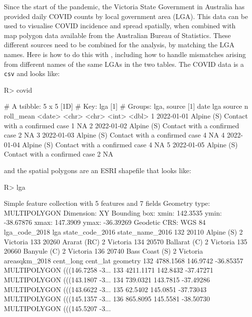 \documentclass[
]{jss}
\begin{document}
Since the start of the pandemic, the Victoria State Government in Australia has provided daily COVID counts by local government area (LGA). This data can be used to visualise COVID incidence and spread spatially, when combined with map polygon data available from the Australian Bureau of Statistics. These different sources need to be combined for the analysis, by matching the LGA names. Here is how to do this with , including how to handle mismatches arising from different names of the same LGAs in the two tables. The COVID data is a \texttt{csv} and looks like:

\begin{CodeChunk}
\begin{CodeInput}
R> covid %
\end{CodeInput}
\begin{CodeOutput}
# A tsibble: 5 x 5 [1D]
# Key:       lga [1]
# Groups:    lga, source [1]
  date       lga        source                            n roll_mean
  <date>     <chr>      <chr>                         <int>     <dbl>
1 2022-01-01 Alpine (S) Contact with a confirmed case     1        NA
2 2022-01-02 Alpine (S) Contact with a confirmed case     2        NA
3 2022-01-03 Alpine (S) Contact with a confirmed case     4        NA
4 2022-01-04 Alpine (S) Contact with a confirmed case     4        NA
5 2022-01-05 Alpine (S) Contact with a confirmed case     2        NA
\end{CodeOutput}
\end{CodeChunk}

and the spatial polygons are an ESRI shapefile that looks like:

\begin{CodeChunk}
\begin{CodeInput}
R> lga %
\end{CodeInput}
\begin{CodeOutput}
Simple feature collection with 5 features and 7 fields
Geometry type: MULTIPOLYGON
Dimension:     XY
Bounding box:  xmin: 142.3535 ymin: -38.67876 xmax: 147.3909 ymax: -36.39269
Geodetic CRS:  WGS 84
    lga_code_2018            lga state_code_2016 state_name_2016
132         20110     Alpine (S)               2        Victoria
133         20260    Ararat (RC)               2        Victoria
134         20570   Ballarat (C)               2        Victoria
135         20660    Banyule (C)               2        Victoria
136         20740 Bass Coast (S)               2        Victoria
    areasqkm_2018 cent_long  cent_lat                       geometry
132     4788.1568  146.9742 -36.85357 MULTIPOLYGON (((146.7258 -3...
133     4211.1171  142.8432 -37.47271 MULTIPOLYGON (((143.1807 -3...
134      739.0321  143.7815 -37.49286 MULTIPOLYGON (((143.6622 -3...
135       62.5402  145.0851 -37.73043 MULTIPOLYGON (((145.1357 -3...
136      865.8095  145.5581 -38.50730 MULTIPOLYGON (((145.5207 -3...
\end{CodeOutput}
\end{CodeChunk}
\end{document}

